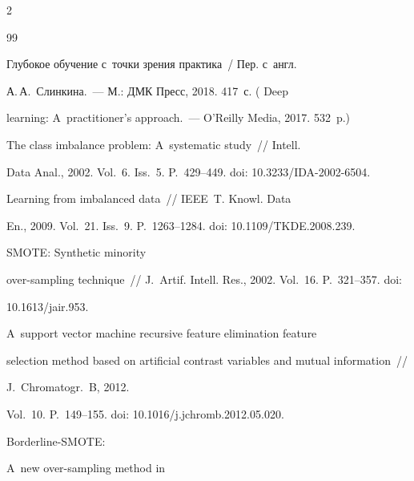 \begin{multicols}{2}
{{ 

 \begin{thebibliography}{99}


 Глубокое обучение с~точки зрения практика~/ Пер. с~англ. 

А.\,А.~Слинкина.~--- М.: ДМК Пресс, 2018. 417~с. ( Deep 

learning: A~practitioner's approach.~--- O'Reilly Media, 2017. 532~p.)





The class imbalance problem: A~systematic study~// Intell. 

Data Anal., 2002. Vol.~6. Iss.~5. P.~429--449. doi: 10.3233/IDA-2002-6504.




 Learning from imbalanced data~// IEEE~T. Knowl. Data 

En., 2009. Vol.~21. Iss.~9. P.~1263--1284. doi: 10.1109/TKDE.2008.239.






 SMOTE: Synthetic minority 

over-sampling technique~// J.~Artif. Intell. Res., 2002. Vol.~16. P.~321--357. doi: 

10.1613/jair.953.




 A~support vector machine recursive feature elimination feature 

selection method based on artificial contrast variables and mutual information~// 

J.~Chromatogr.~B, 2012. 

Vol.~10. P.~149--155. doi: 10.1016/j.jchromb.2012.05.020.




 Borderline-SMOTE: 

A~new over-sampling method in 


\end{thebibliography}}}
\end{multicols}
